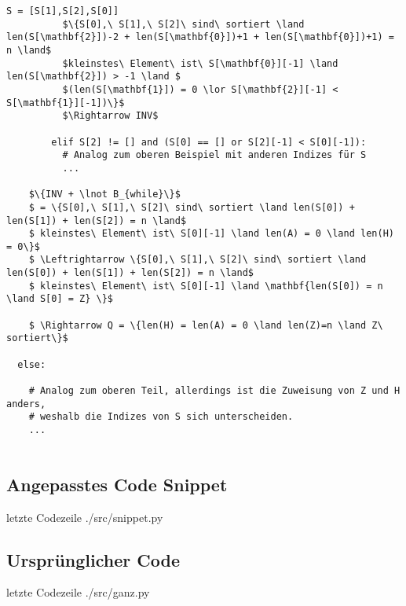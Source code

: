 \begin{lstlisting}[mathescape=true]
		  S = [S[1],S[2],S[0]]	
		  $\{S[0],\ S[1],\ S[2]\ sind\ sortiert \land len(S[\mathbf{2}])-2 + len(S[\mathbf{0}])+1 + len(S[\mathbf{0}])+1) = n \land$
		  $kleinstes\ Element\ ist\ S[\mathbf{0}][-1] \land len(S[\mathbf{2}]) > -1 \land $
		  $(len(S[\mathbf{1}]) = 0 \lor S[\mathbf{2}][-1] < S[\mathbf{1}][-1])\}$
          $\Rightarrow INV$
          
		elif S[2] != [] and (S[0] == [] or S[2][-1] < S[0][-1]):
          # Analog zum oberen Beispiel mit anderen Indizes für S		  
		  ...
	
	$\{INV + \lnot B_{while}\}$
	$ = \{S[0],\ S[1],\ S[2]\ sind\ sortiert \land len(S[0]) + len(S[1]) + len(S[2]) = n \land$
	$ kleinstes\ Element\ ist\ S[0][-1] \land len(A) = 0 \land len(H) = 0\}$
	$ \Leftrightarrow \{S[0],\ S[1],\ S[2]\ sind\ sortiert \land len(S[0]) + len(S[1]) + len(S[2]) = n \land$
	$ kleinstes\ Element\ ist\ S[0][-1] \land \mathbf{len(S[0]) = n \land S[0] = Z} \}$
	
	$ \Rightarrow Q = \{len(H) = len(A) = 0 \land len(Z)=n \land Z\ sortiert\}$

  else:

    # Analog zum oberen Teil, allerdings ist die Zuweisung von Z und H anders, 
    # weshalb die Indizes von S sich unterscheiden.
    ...
	

\end{lstlisting}

\subsection{Angepasstes Code Snippet}
 letzte Codezeile
{./src/snippet.py}

\subsection{Ursprünglicher Code}
 letzte Codezeile
{./src/ganz.py}

